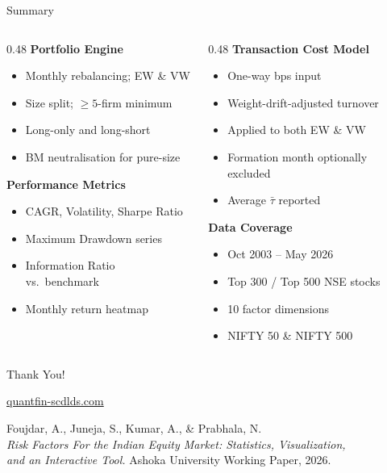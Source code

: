 \documentclass[aspectratio=169, 12pt]{beamer}
\begin{document}
\begin{frame}{Summary}
  \begin{columns}[T]
    \begin{column}{0.48\textwidth}
      {\textbf{Portfolio Engine}}
      \begin{itemize}
        \item Monthly rebalancing; EW \& VW
        \item Size split; $\geq 5$-firm minimum
        \item Long-only and long-short
        \item BM neutralisation for pure-size
      \end{itemize}
      \bigskip
      {\textbf{Performance Metrics}}
      \begin{itemize}
        \item CAGR, Volatility, Sharpe Ratio
        \item Maximum Drawdown series
        \item Information Ratio vs.\ benchmark
        \item Monthly return heatmap
      \end{itemize}
    \end{column}
    \begin{column}{0.48\textwidth}
      {\textbf{Transaction Cost Model}}
      \begin{itemize}
        \item One-way bps input
        \item Weight-drift-adjusted turnover
        \item Applied to both EW \& VW
        \item Formation month optionally excluded
        \item Average $\bar{\tau}$ reported
      \end{itemize}
      \bigskip
      {\textbf{Data Coverage}}
      \begin{itemize}
        \item Oct 2003 -- May 2026
        \item Top 300 / Top 500 NSE stocks
        \item 10 factor dimensions
        \item NIFTY 50 \& NIFTY 500
      \end{itemize}
    \end{column}
  \end{columns}
\end{frame}

\begin{frame}[standout]
  \Huge Thank You!
  \vspace{12pt}

  \normalsize
  \href{https://quantfin-scdlds.com}{quantfin-scdlds.com}

  \vspace{8pt}
  \small
  Foujdar, A., Juneja, S., Kumar, A., \& Prabhala, N.\\
  \textit{Risk Factors For the Indian Equity Market: Statistics, Visualization,\\
  and an Interactive Tool.} Ashoka University Working Paper, 2026.
\end{frame}
\end{document}
